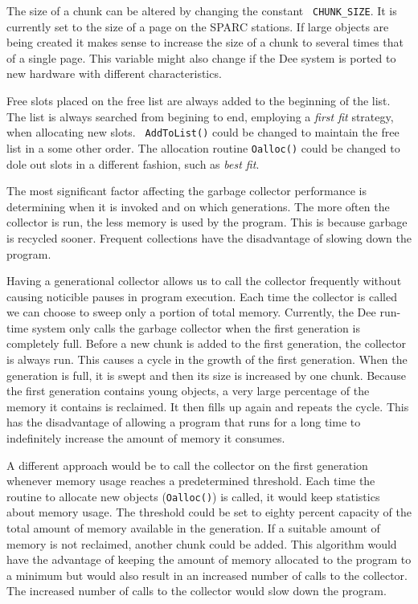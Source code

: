 The size of a chunk can be altered by changing the constant {\tt
CHUNK\_SIZE}.  It is currently set to the size of a page on the SPARC
stations.  If large objects are being created it makes sense to
increase the size of a chunk to several times that of a single page.
This variable might also change if the Dee system is ported to new
hardware with different characteristics.  

Free slots placed on the free list are always added to the beginning of
the list.  The list is always searched from begining to end, employing
a {\em first fit} strategy, when allocating new slots.  {\tt
AddToList()} could be changed to maintain the free list in a some
other order.  The allocation routine {\tt Oalloc()} could be changed
to dole out slots in a different fashion, such as {\em best fit}.

The most significant factor affecting the garbage collector
performance is determining when it is invoked and on which
generations.  The more often the collector is run, the less memory is
used by the program.  This is because garbage is recycled sooner.
Frequent collections have the disadvantage of slowing down the
program.  

Having a generational collector allows us to call the collector
frequently without causing noticible pauses in program execution.
Each time the collector is called we can choose to sweep only a
portion of total memory.  Currently, the Dee run-time system only
calls the garbage collector when the first generation is completely
full.  Before a new chunk is added to the first generation, the
collector is always run.  This causes a cycle in the growth of the
first generation.  When the generation is full, it is swept and then
its size is increased by one chunk.  Because the first generation
contains young objects, a very large percentage of the memory it
contains is reclaimed.  It then fills up again and repeats the cycle.
This has the disadvantage of allowing a program that runs for a long
time to indefinitely increase the amount of memory it consumes.

A different approach would be to call the collector on the first
generation whenever memory usage reaches a predetermined threshold.
Each time the routine to allocate new objects ({\tt Oalloc()}) is
called, it would keep statistics about memory usage.  The threshold
could be set to eighty percent capacity of the total amount of memory
available in the generation.  If a suitable amount of memory is not
reclaimed, another chunk could be added.  This algorithm would have
the advantage of keeping the amount of memory allocated to the program
to a minimum but would also result in an increased number of calls to
the collector.  The increased number of calls to the collector would
slow down the program.

